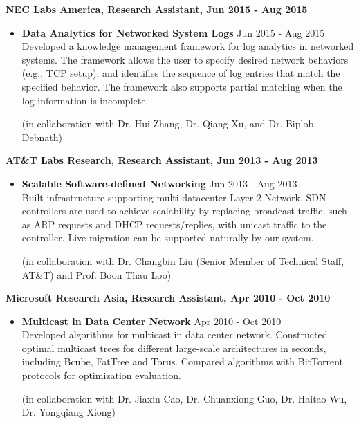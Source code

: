 {\bf NEC Labs America, Research Assistant, Jun 2015 - Aug
  2015}

\begin{itemize}
\item {\bf Data Analytics for Networked System Logs} \hfill Jun 2015 - Aug 2015\\
Developed a knowledge management framework for log analytics in networked
systems. The framework allows the user to specify desired network behaviors
(e.g., TCP setup), and identifies the sequence of log entries that match the
specified behavior. The framework also supports partial matching when the log
information is incomplete.

(in collaboration with Dr. Hui Zhang, Dr. Qiang Xu, and Dr. Biplob Debnath)
\end{itemize}

{\bf AT\&T Labs Research, Research Assistant, Jun 2013 - Aug
  2013}

\begin{itemize}
\item {\bf Scalable Software-defined Networking} \hfill Jun 2013 - Aug 2013\\
Built infrastructure supporting multi-datacenter Layer-2 Network. SDN controllers
are used to achieve scalability by replacing broadcast traffic, such as ARP
requests and DHCP requests/replies, with unicast traffic to the controller. Live
migration can be supported naturally by our system.

(in collaboration with Dr. Changbin Liu (Senior Member of Technical Staff, AT\&T) and Prof. Boon Thau Loo)
\end{itemize}


{\bf Microsoft Research Asia, Research Assistant, Apr 2010
- Oct 2010}

\begin{itemize}
\item {\bf Multicast in Data Center Network} \hfill Apr 2010 - Oct 2010\\
Developed algorithms for multicast in data center network. Constructed optimal
multicast trees for different large-scale architectures in seconds, including
Bcube, FatTree and Torus. Compared algorithms with BitTorrent protocols for
optimization evaluation.

(in collaboration with Dr. Jiaxin Cao, Dr. Chuanxiong Guo, Dr. Haitao Wu, Dr. Yongqiang Xiong)
\end{itemize}

